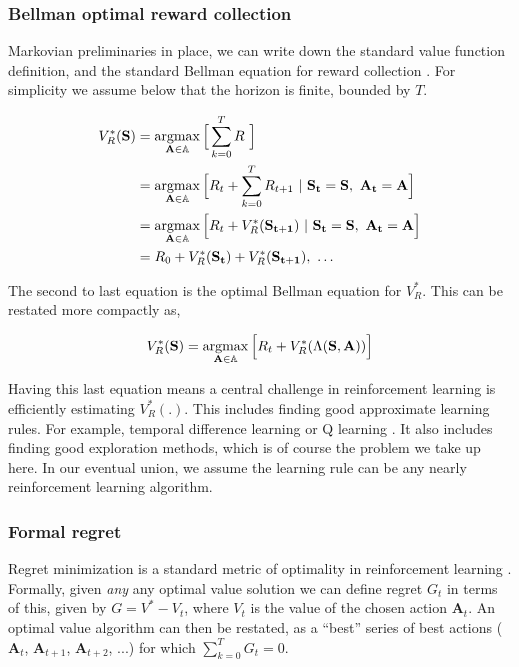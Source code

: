 \subsubsection*{Bellman optimal reward collection}
Markovian preliminaries in place, we can write down the standard value function definition, and the standard Bellman equation \cite{Bellmann1954} for reward collection \cite{Sutton2018}. For simplicity we assume below that the horizon is finite, bounded by $T$.

\begin{equation} 
	\label{eq:bellman_seq}
    \begin{split}
        V^*_{R}(\mathbf{S}) &= \argmax_{\mathbf{A} \in \mathbb{A}} \Big [\sum_{k=0}^{T}  R \ \Big ]\\
                         	&= \argmax_{\mathbf{A} \in \mathbb{A}} \Big [ R_{t} + \sum_{k=0}^{T} R_{t+1} \ | \ \mathbf{S_t} = \mathbf{S},\ \mathbf{A_t} = \mathbf{A} \Big ]\\
							&= \argmax_{\mathbf{A} \in \mathbb{A}} \Big [ R_{t} + V^*_{R}(\mathbf{S_{t+1}}) \ | \ \mathbf{S_t} = \mathbf{S},\ \mathbf{A_t} = \mathbf{A} \Big ]\\
                         	&= R_0 + V^*_{R}(\mathbf{S_{t}}) + V^*_{R}(\mathbf{S_{t+1}}),\ \ldots
    \end{split}
\end{equation}

The second to last equation is the optimal Bellman equation for $V^*_R$. This can be restated more compactly as,

\begin{equation} 
\label{eq:bellman_iter}
V^*_R(\mathbf{S}) = \operatorname*{argmax}_{\mathbf{A} \in \mathbb{A}} \Big [ R_{t}  + V^*_{R}(\Lambda(\mathbf{S},\mathbf{A})) \Big ]
\end{equation}

Having this last equation means a central challenge in reinforcement learning is efficiently estimating $V^*_{R}(.)$. This includes finding good approximate learning rules. For example, temporal difference learning or Q learning \cite{Sutton2018}. It also includes finding good exploration methods, which is of course the problem we take up here. In our eventual union, we assume the learning rule can be any nearly reinforcement learning algorithm. 


\subsubsection*{Formal regret}
Regret minimization is a standard metric of optimality in reinforcement learning \cite{Sutton2018}. Formally, given \emph{any} any optimal value solution we can define regret $G_t$ in terms of this, given by $G = V^* - V_t$, where $V_t$ is the value of the chosen action $\mathbf{A}_t$. An optimal value algorithm can then be restated, as a ``best'' series of best actions ($\mathbf{A}_t$, $\mathbf{A}_{t+1}$, $\mathbf{A}_{t+2}$, ...) for which $\sum_{k=0}^{T} G_t = 0$.

